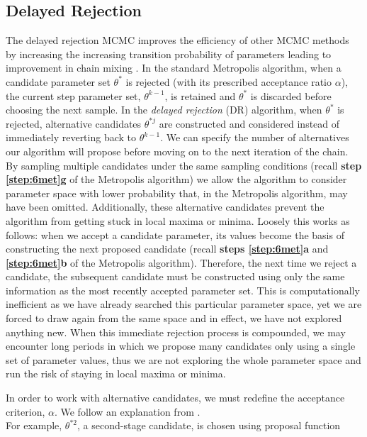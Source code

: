 \documentclass{article}
\begin{document}
\subsection{Delayed Rejection}
\par The delayed rejection MCMC improves the efficiency of other MCMC methods by increasing the increasing transition probability of parameters leading to improvement in chain mixing \cite{trias2009delayed}. In the standard Metropolis algorithm, when a candidate parameter set $\theta^*$ is rejected (with its prescribed acceptance ratio $\alpha$), the current step parameter set, $\theta^{k-1}$, is retained and $\theta^*$ is discarded before choosing the next sample. In the \emph{delayed rejection} (DR) algorithm, when $\theta^*$ is rejected, alternative candidates $\theta^{*j}$ are constructed and considered instead of immediately reverting back to $\theta^{k-1}$. We can specify the number of alternatives our algorithm will propose before moving on to the next iteration of the chain. By sampling multiple candidates under the same sampling conditions (recall \textbf{step \ref{step:6met}g} of the Metropolis algorithm) we allow the algorithm to consider parameter space with lower probability that, in the Metropolis algorithm, may have been omitted. Additionally, these alternative candidates prevent the algorithm from getting stuck in local maxima or minima. Loosely this works as follows: when we accept a candidate parameter, its values become the basis of constructing the next proposed candidate (recall \textbf{steps \ref{step:6met}a} and \textbf{\ref{step:6met}b} of the Metropolis algorithm). Therefore, the next time we reject a candidate, the subsequent candidate must be constructed using only the same information as the most recently accepted parameter set. This is computationally inefficient as we have already searched this particular parameter space, yet we are forced to draw again from the same space and in effect, we have not explored anything new. When this immediate rejection process is compounded, we may encounter long periods in which we propose many candidates only using a single set of parameter values, thus we are not exploring the whole parameter space and run the risk of staying in local maxima or minima.
\par In order to work with alternative candidates, we must redefine the acceptance criterion, $\alpha$. We follow an explanation from \cite{smithCh8}.\\
For example, $\theta^{*2}$, a second-stage candidate, is chosen using proposal function
\end{document}
